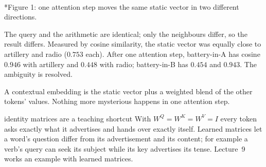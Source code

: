 \documentclass[11pt]{article}
\begin{document}
\begin{center}\\*{\small\color{GreyN}Figure 1: one attention step moves the same static vector in two different directions.}\end{center}
The query and the arithmetic are identical; only the neighbours differ, so the result differs. Measured by cosine similarity, the static vector was equally close to artillery and radio ($0.753$ each). After one attention step, battery-in-A has cosine $0.946$ with artillery and $0.448$ with radio; battery-in-B has $0.454$ and $0.943$. The ambiguity is resolved.
\begin{keypoint}
A contextual embedding is the static vector plus a weighted blend of the other tokens' values. Nothing more mysterious happens in one attention step.
\end{keypoint}
\begin{pitfall}{identity matrices are a teaching shortcut}
With $W^Q=W^K=W^V=I$ every token asks exactly what it advertises and hands over exactly itself. Learned matrices let a word's question differ from its advertisement and its content; for example a verb's query can seek its subject while its key advertises its tense. Lecture~9 works an example with learned matrices.
\end{pitfall}
\end{document}
